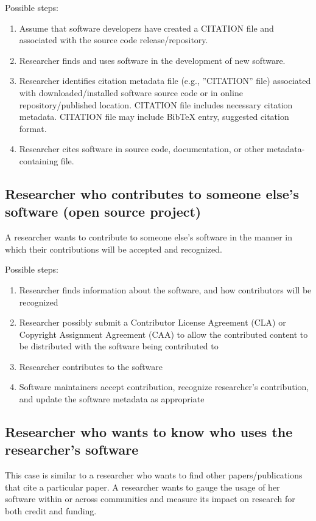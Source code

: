 \documentclass[12pt, oneside]{amsart}
\begin{document}
Possible steps:
\begin{enumerate} \setcounter{enumi}{0}
\item Assume that software developers have created a CITATION file and associated with the source code release/repository.
\item Researcher finds and uses software in the development of new software.
\item Researcher identifies citation metadata file (e.g., ''CITATION'' file) associated with downloaded/installed software source code or in online repository/published location. CITATION file includes necessary citation metadata. CITATION file may include BibTeX entry, suggested citation format.
\item Researcher cites software in source code, documentation, or other metadata-containing file.
\end{enumerate}

\subsection{Researcher who contributes to someone else's software (open source project)}

A researcher wants to contribute to someone else's software in the manner in which their contributions will be accepted and recognized.

Possible steps:
\begin{enumerate}
\item Researcher finds information about the software, and how contributors will be recognized
\item Researcher possibly submit a Contributor License Agreement (CLA) or Copyright Assignment Agreement (CAA) to allow the contributed content to be distributed with the software being contributed to
\item Researcher contributes to the software
\item Software maintainers accept contribution, recognize researcher's contribution, and update the software metadata as appropriate
\end{enumerate}

\subsection{Researcher who wants to know who uses the researcher's software}

This case is similar to a researcher who wants to find other papers/publications that cite a particular paper.
A researcher wants to gauge the usage of her software within or across communities and measure its impact on research for both credit and funding.
\end{document}
